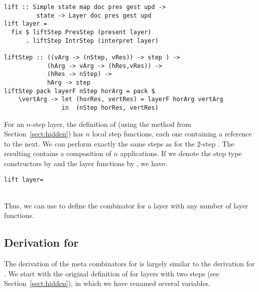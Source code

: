 \documentclass[preprint,natbib]{sigplanconf}
\begin{document}
\begin{small} %
\begin{verbatim}
lift :: Simple state map doc pres gest upd ->
         state -> Layer doc pres gest upd
lift layer = 
  fix $ liftStep PresStep (present layer) 
      . liftStep IntrStep (interpret layer)

liftStep :: ((vArg -> (nStep, vRes)) -> step ) ->
            (hArg -> vArg -> (hRes,vRes)) ->
            (hRes -> nStep) ->
            hArg -> step
liftStep pack layerF nStep horArg = pack $
    \vertArg -> let (horRes, vertRes) = layerF horArg vertArg                     
                in  (nStep horRes, vertRes)
\end{verbatim}
\end{small}



For an $n$-step layer, the definition of  (using the method from Section~\ref{sect:hidden}) has $n$ local step functions, each one containing a reference to the next. \bc {} \ec We can perform exactly the same steps as for the 2-step . The resulting  contains a composition of $n$  applications. If we denote the step type constructors by  and the layer functions by , we have:

\begin{small}
\begin{tabbing}
{\tt li}\={\tt ft l}\={\tt ayer= }\\
\\
\end{tabbing}%
\end{small}

Thus, we can use   to define the  combinator for a layer with any number of layer functions.


%																
\subsection{Derivation for } \label{subsubsectcombine}


The derivation of the meta combinators for  is largely similar to the derivation for . We start with the original definition of  for layers with two steps (see Section~\ref{sect:hidden}), in which we have renamed several variables. 
\end{document}
